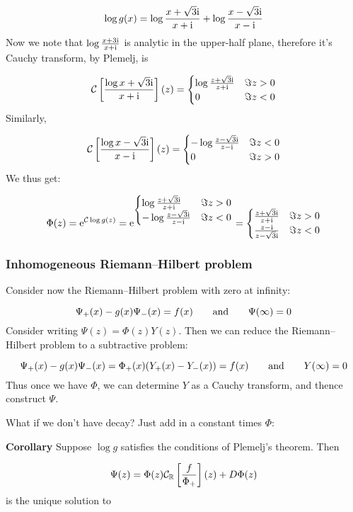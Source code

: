 \documentclass[12pt,landscape]{article}
\def\qqand{\qquad\hbox{and}\qquad}
\def\I{ {\rm i} }
\def\E{ {\rm e} }
\def\R{ {\mathbb R} }
\def\CC{ {\cal C} }
\def\br[#1]{\left[{#1}\right]}
\def\endash{–}
\begin{document}
{\[
\log g(x) = \log{x+\sqrt 3\I \over x+\I} + \log {x-\sqrt 3\I \over x-\I}
\]
Now we note that $\log{x+3\I \over x+\I}$ is analytic in the upper-half plane, therefore it's Cauchy transform, by Plemelj, is

\[
\CC\br[\log{x+\sqrt 3\I \over x+\I}](z) = \begin{cases}
        \log{z+\sqrt 3\I \over z+\I} & \Im z > 0 \\
           0 & \Im z < 0
           \end{cases}
\]
Similarly,

\[
\CC\br[\log{x-\sqrt 3\I \over x-\I}](z) = \begin{cases}
        -\log{z-\sqrt 3\I \over z-\I} & \Im z < 0 \\
           0 & \Im z > 0
           \end{cases}
\]
We thus get:

\[
\Phi(z) = \E^{\CC\log g(z)} = \E^{\begin{cases}
        \log{z+\sqrt 3 \I \over z+\I} & \Im z > 0 \\
            -\log{z- \sqrt 3\I \over z-\I} & \Im z < 0
           \end{cases}} = \begin{cases}
        {z+ \sqrt 3 \I \over z+\I} & \Im z > 0 \\
            {z-\I \over z-\sqrt 3\I} & \Im z < 0
           \end{cases}
\]
\subsubsection{Inhomogeneous Riemann\ensuremath{\endash}Hilbert problem}
Consider now the  Riemann\ensuremath{\endash}Hilbert problem with zero at infinity:

\[
\Psi_+(x) - g(x)\Psi_-(x) = f(x) \qqand \Psi(\infty) =0
\]
Consider writing $\Psi(z) =  \Phi(z) Y(z)$. Then we can reduce the Riemann\ensuremath{\endash}Hilbert problem to a subtractive problem:

\[
\Psi_+(x) - g(x)\Psi_-(x) = \Phi_+(x)(Y_+(x) - Y_-(x))=f(x)\qqand Y(\infty) = 0
\]
Thus once we have $\Phi$, we can determine $Y$ as a Cauchy transform, and thence construct $\Psi$.

What if we don't have decay? Just add in a constant times $\Phi$:

\textbf{Corollary} Suppose $\log g$ satisfies the conditions of Plemelj's theorem. Then

\[
\Psi(z) = \Phi(z) \CC_\R\br[{f \over \Phi_+}](z) + D \Phi(z)
\]
is the unique solution to

}
\end{document}

